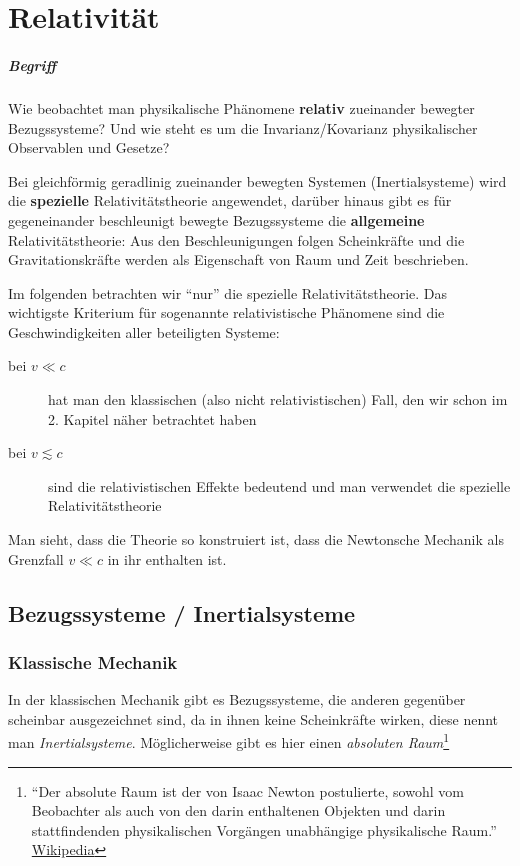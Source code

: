 \documentclass[oneside]{book}
\theoremstyle{definition}
\newcommand{\conseq}{$\rightarrow$~}
\begin{document}
\chapter{Relativität}

\paragraph{Begriff} Wie beobachtet man physikalische Phänomene \textbf{relativ} zueinander bewegter Bezugssysteme? Und wie steht es um die Invarianz/Kovarianz physikalischer Observablen und Gesetze?

Bei gleichförmig geradlinig zueinander bewegten Systemen (Inertialsysteme) wird die \textbf{spezielle} Relativitätstheorie angewendet, darüber hinaus gibt es für gegeneinander beschleunigt bewegte Bezugssysteme die \textbf{allgemeine} Relativitätstheorie: Aus den Beschleunigungen folgen Scheinkräfte und die Gravitationskräfte werden als Eigenschaft von Raum und Zeit beschrieben.

Im folgenden betrachten wir "`nur"' die spezielle Relativitätstheorie.
Das wichtigste Kriterium für sogenannte relativistische Phänomene sind die Geschwindigkeiten aller beteiligten Systeme:
\begin{description}
	\item[bei $v \ll c$] hat man den klassischen (also nicht relativistischen) Fall, den wir schon im 2. Kapitel näher betrachtet haben
	\item[bei $v \lesssim c $] sind die relativistischen Effekte bedeutend und man verwendet die spezielle Relativitätstheorie
\end{description}
Man sieht, dass die Theorie so konstruiert ist, dass die Newtonsche Mechanik als Grenzfall $v \ll c$ in ihr enthalten ist.

\section{Bezugssysteme / Inertialsysteme}
\subsection{Klassische Mechanik}
In der klassischen Mechanik gibt es Bezugssysteme, die anderen gegenüber scheinbar ausgezeichnet sind, da in ihnen keine Scheinkräfte wirken, diese nennt man \textit{Inertialsysteme}. Möglicherweise gibt es hier einen \textit{absoluten Raum}\footnote{"`Der absolute Raum ist der von Isaac Newton postulierte, sowohl vom Beobachter als auch von den darin enthaltenen Objekten und darin stattfindenden physikalischen Vorgängen unabhängige physikalische Raum."' \href{https://de.wikipedia.org/wiki/Absoluter_Raum}{Wikipedia}}
\end{document}
